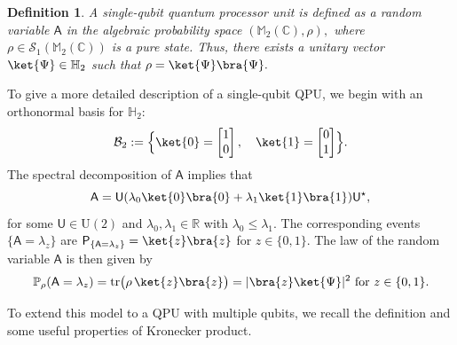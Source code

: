 \documentclass[a4paper,11pt]{article}
\newtheorem{definition}[theorem]{Definition}
\DeclareMathOperator{\tr}{tr}
\newcommand{\rP}{\mathsf{P}}
\newcommand{\rU}{\mathsf{U}}
\newcommand{\rA}{\mathsf{A}}
\begin{document}
\begin{definition}
A \emph{single-qubit quantum processor unit} is defined as a random variable $\rA$ in the algebraic probability space $(\mathbb{M}_2(\mathbb{C}),\rho),$ where $\rho \in \mathcal{S}_1(\mathbb{M}_2(\mathbb{C}))$ is a pure state. Thus, there exists a unitary vector $\ket{\Psi}\in \mathbb{H}_2$ such that $\rho = \ket{\Psi}\bra{\Psi}.$
\end{definition}

To give a more detailed description of a single-qubit QPU, we begin with an orthonormal basis for \(\mathbb{H}_2\):
\[
\mathcal{B}_2 := \Bigl\{\ket{0} = \begin{bmatrix} 1 \\ 0 \end{bmatrix}, \quad \ket{1} = \begin{bmatrix} 0 \\ 1 \end{bmatrix}\Bigr\}.
\]
The spectral decomposition of $\rA$ implies that
\[  
\rA = \rU (\lambda_0 \ket{0}\bra{0} + \lambda_1 \ket{1}\bra{1}) \rU^{\star},
\]
for some $\rU \in \mathrm{U}(2)$ and $\lambda_0,\lambda_1 \in \mathbb{R}$ with $\lambda_0 \le \lambda_1.$ The corresponding events $\{\rA = \lambda_z\}$ are
$\rP_{\{\rA = \lambda_z\}} = \ket{z}\bra{z}$ for
$z \in \{0,1\}.$ The law of the random variable $\rA$ is then given by
\[
\mathbb{P}_{\rho}(\rA = \lambda_z) = \tr\bigl(\rho\,\ket{z}\bra{z}\bigr) = |\bra{z}\ket{\Psi}|^2  \text{ for } z \in \{0,1\}.
\]

\bigskip

To extend this model to a QPU with multiple qubits, we recall the definition and some useful properties of Kronecker product. 

\bigskip
\end{document}
